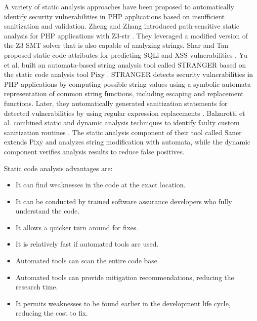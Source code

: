 A variety of static analysis approaches have been proposed
to automatically identify security vulnerabilities in PHP applications
based on insufficient sanitization and validation.
Zheng and Zhang introduced path-sensitive static analysis
for PHP applications with Z3-str \cite{ref_94_zheng2013path}. They leveraged a
modified version of the Z3 SMT solver that is also capable
of analyzing strings. Shar and Tan proposed static code attributes
for predicting SQLi and XSS vulnerabilities \cite{ref_97_shar2012predicting, ref_98_shar2013mining}. Yu et al. built an automata-based string analysis tool
called STRANGER \cite{ref_95_yu2010stranger} based on the static code analysis
tool Pixy \cite{ref_99_jovanovic2006pixy}. STRANGER detects security vulnerabilities
in PHP applications by computing possible string
values using a symbolic automata representation of common
string functions, including escaping and replacement
functions. Later, they automatically generated sanitization
statements for detected vulnerabilities by using regular expression
replacements \cite{ref_96_yu2011patching}. Balzarotti et al. combined static
and dynamic analysis techniques to identify faulty custom
sanitization routines \cite{ref_62_balzarotti2008saner}. The static analysis component of
their tool called Saner extends Pixy and analyzes string
modification with automata, while the dynamic component
verifies analysis results to reduce false positives.

Static code analysis advantages are:
\begin{itemize}
	\item It can find weaknesses in the code at the exact location.
	\item It can be conducted by trained software assurance developers who fully understand the code.
	\item It allows a quicker turn around for fixes.
	\item It is relatively fast if automated tools are used.
	\item Automated tools can scan the entire code base.
	\item Automated tools can provide mitigation recommendations, reducing the research time.
	\item It permits weaknesses to be found earlier in the development life cycle, reducing the cost to fix.
\end{itemize}

